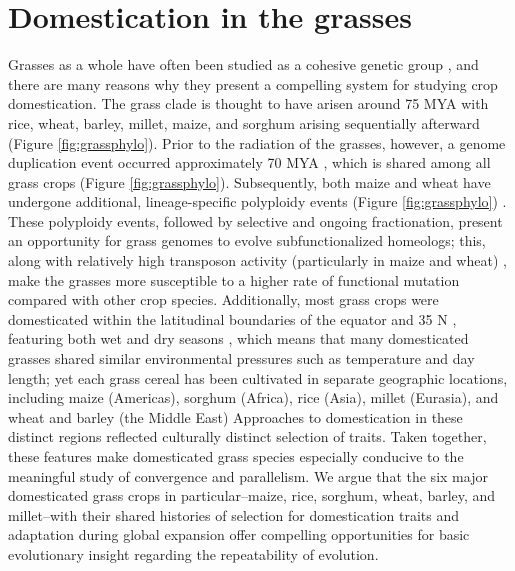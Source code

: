 \documentclass[12pt]{article}
\begin{document}
\section*{Domestication in the grasses}
Grasses as a whole have often been studied as a cohesive genetic group \citep{pmid8379002, pmid11244100}, and there are many reasons why they present a compelling system for studying crop domestication.
The grass clade is thought to have arisen around 75 MYA \citep{BOUCHENAKKHELLADI2010, Kellogg2001} with rice, wheat, barley, millet, maize, and sorghum arising sequentially afterward (Figure \ref{fig:grassphylo}).
Prior to the radiation of the grasses, however, a genome duplication event occurred approximately 70 MYA \citep{Paterson2004}, which is shared among all grass crops (Figure \ref{fig:grassphylo}).
Subsequently, both maize and wheat have undergone additional, lineage-specific polyploidy events (Figure \ref{fig:grassphylo}) \citep{Levy2002}.
These polyploidy events, followed by selective and ongoing fractionation, present an opportunity for grass genomes to evolve subfunctionalized homeologs; this, along with relatively high transposon activity (particularly in maize and wheat) \citep{Wicker2016, Lisch2001}, make the grasses more susceptible to a higher rate of functional mutation compared with other crop species.  
Additionally, most grass crops were domesticated within the latitudinal boundaries of the equator and 35 N \citep{Jain1993, Gepts2010}, featuring both wet and dry seasons \citep{Jain1993}, which means that many domesticated grasses shared similar environmental pressures such as temperature and day length; yet each grass cereal has been cultivated in separate geographic locations, including maize (Americas), sorghum (Africa), rice (Asia), millet (Eurasia), and wheat and barley (the Middle East) \citep{Glmin2009}
Approaches to domestication in these distinct regions reflected culturally distinct selection of traits.
Taken together, these features make domesticated grass species especially conducive to the meaningful study of convergence and parallelism.
We argue that the six major domesticated grass crops in particular--maize, rice, sorghum, wheat, barley, and millet--with their shared histories of selection for domestication traits and adaptation during global expansion offer compelling opportunities for basic evolutionary insight regarding the repeatability of evolution.
\end{document}
